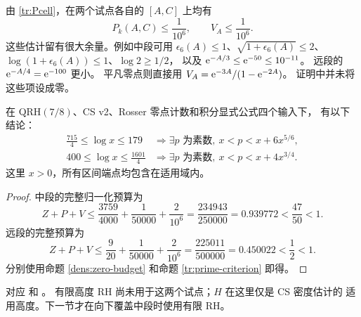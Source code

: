 由 \eqref{tr:Pcell}，在两个试点各自的 $[A,C]$ 上均有
\begin{equation}\label{cert:smallPV}
 P_k(A,C)\leq\frac1{10^6},\qquad V_A\leq\frac1{10^6}.
\end{equation}
这些估计留有很大余量。例如中段可用
$\epsilon_6(A)\leq1$、$\sqrt{1+\epsilon_6(A)}\leq2$、
$\log(1+\epsilon_6(A))\leq1$、$\log2\geq1/2$，
以及 $\mathrm e^{-A/3}\leq\mathrm e^{-50}\leq10^{-11}$。
远段的 $\mathrm e^{-A/4}=\mathrm e^{-100}$ 更小。
平凡零点则直接用 $V_A=\mathrm e^{-3A}/(1-\mathrm e^{-2A})$。
证明中并未将这些项设成零。

\begin{proposition}[两个完整试点证书]\label{cert:pilots}
在 QRH$(7/8)$、CS v2、Rosser 零点计数和积分显式公式四个输入下，
有以下结论：
\begin{align*}
 \frac{715}{4}\leq\log x\leq179
 &\Longrightarrow \exists p\text{ 为素数},\
                 x<p<x+6x^{5/6},\\
 400\leq\log x\leq\frac{1601}{4}
 &\Longrightarrow \exists p\text{ 为素数},\
                 x<p<x+4x^{3/4}.
\end{align*}
这里 $x>0$，所有区间端点均包含在适用域内。
\end{proposition}
\begin{proof}
中段的完整归一化预算为
\[
 Z+P+V\leq\frac{3759}{4000}+\frac1{50000}
                          +\frac2{10^6}
 =\frac{234943}{250000}=0.939772<\frac{47}{50}<1.
\]
远段的完整预算为
\[
 Z+P+V\leq\frac9{20}+\frac1{50000}+\frac2{10^6}
 =\frac{225011}{500000}=0.450022<\frac12<1.
\]
分别使用命题 \ref{dens:zero-budget} 和命题
\ref{tr:prime-criterion} 即得。
\end{proof}
对应 
和 。
有限高度 RH 尚未用于这两个试点；$H$ 在这里仅是 CS 密度估计的
适用高度。下一节才在向下覆盖中段时使用有限 RH。
